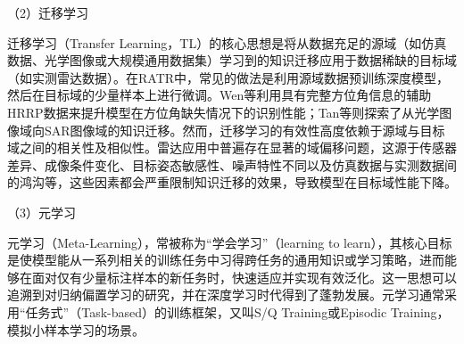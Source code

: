（2）迁移学习

迁移学习（Transfer Learning，TL）的核心思想是将从数据充足的源域（如仿真数据、光学图像或大规模通用数据集）学习到的知识迁移应用于数据稀缺的目标域（如实测雷达数据）。在RATR中，常见的做法是利用源域数据预训练深度模型，然后在目标域的少量样本上进行微调。Wen等利用具有完整方位角信息的辅助HRRP数据来提升模型在方位角缺失情况下的识别性能；Tan等则探索了从光学图像域向SAR图像域的知识迁移。然而，迁移学习的有效性高度依赖于源域与目标域之间的相关性及相似性。雷达应用中普遍存在显著的域偏移问题，这源于传感器差异、成像条件变化、目标姿态敏感性、噪声特性不同以及仿真数据与实测数据间的鸿沟等，这些因素都会严重限制知识迁移的效果，导致模型在目标域性能下降。

（3）元学习

元学习（Meta-Learning），常被称为“学会学习”（learning to learn），其核心目标是使模型能从一系列相关的训练任务中习得跨任务的通用知识或学习策略，进而能够在面对仅有少量标注样本的新任务时，快速适应并实现有效泛化。这一思想可以追溯到对归纳偏置学习的研究，并在深度学习时代得到了蓬勃发展。元学习通常采用“任务式”（Task-based）的训练框架，又叫S/Q Training或Episodic Training，模拟小样本学习的场景。

